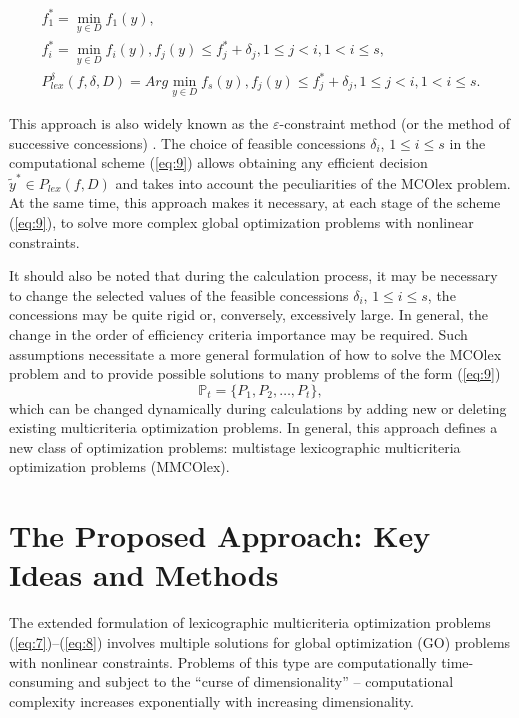 \documentclass[smallextended]{svjour3}       %
\begin{document}
\begin{equation}\label{eq:9}
\begin{matrix}
f^*_1 =\min_{y \in D}{f_1(y)},  \\
f^*_i =\min_{y \in D}{f_i(y)},  f_j(y) \leq f^*_j + \delta_j, 1 \leq j < i, 1 < i \leq s, \\
P_{lex}^\delta(f,\delta,D) = Arg \min_{y \in D}{f_s(y)},f_j(y) \leq f^*_j + \delta_j, 1 \leq j < i, 1 < i \leq s.
\end{matrix}
\end{equation}

This approach is also widely known as the $\varepsilon$-constraint method (or the method of successive concessions) \cite{c39,c40,c41,c42}. The choice of feasible concessions $\delta_i$, $1 \leq i \leq s$ in the computational scheme (\ref{eq:9}) allows obtaining any efficient decision $\widetilde{y}^* \in P_{lex}(f,D)$ and takes into account the peculiarities of the MCOlex problem. At the same time, this approach makes it necessary, at each stage of the scheme (\ref{eq:9}), to solve more complex global optimization problems with nonlinear constraints.

It should also be noted that during the calculation process, it may be necessary to change the selected values of the feasible concessions $\delta_i$, $1 \leq i \leq s$, the concessions may be quite rigid or, conversely, excessively large. In general, the change in the order of efficiency criteria importance may be required. Such assumptions necessitate a more general formulation of how to solve the MCOlex problem and to provide possible solutions to many problems of the form (\ref{eq:9})
\begin{equation}\label{eq:10}
\mathbb{P}_t=\{ P_1,P_2,\dots,P_t\},
\end{equation}
which can be changed dynamically during calculations by adding new or deleting existing multicriteria optimization problems. In general, this approach defines a new class of optimization problems: multistage lexicographic multicriteria optimization problems (MMCOlex).

\section{The Proposed Approach: Key Ideas and Methods}
\label{sec:3}

The extended formulation of lexicographic multicriteria optimization problems (\ref{eq:7})--(\ref{eq:8}) involves multiple solutions for global optimization (GO) problems with nonlinear constraints. Problems of this type are computationally time-consuming and subject to the ``curse of dimensionality'' -- computational complexity increases exponentially with increasing dimensionality.
\end{document}
